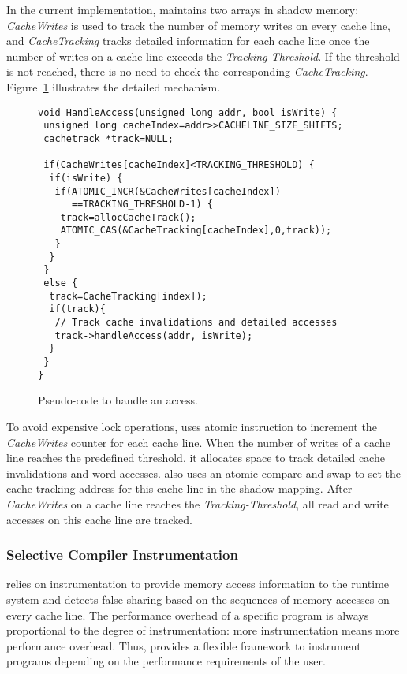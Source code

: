 In the current implementation, \Predator{} maintains two arrays in shadow memory: 
{\it CacheWrites} is used to track the number of memory writes on every cache line, and
{\it CacheTracking} tracks detailed information 
for each cache line once the number of writes on a cache line exceeds
the {\it Tracking-Threshold}. 
If the threshold is not reached, there is no need to check the corresponding {\it CacheTracking}. 
Figure~\ref{fig:algorithm} illustrates the detailed mechanism.

\begin{figure}[!t]
\begin{lstlisting}
void HandleAccess(unsigned long addr, bool isWrite) {
 unsigned long cacheIndex=addr>>CACHELINE_SIZE_SHIFTS;
 cachetrack *track=NULL;

 if(CacheWrites[cacheIndex]<TRACKING_THRESHOLD) {
  if(isWrite) {
   if(ATOMIC_INCR(&CacheWrites[cacheIndex]) 
      ==TRACKING_THRESHOLD-1) {
    track=allocCacheTrack();
    ATOMIC_CAS(&CacheTracking[cacheIndex],0,track));
   }
  } 
 }
 else {
  track=CacheTracking[index]);
  if(track){
   // Track cache invalidations and detailed accesses
   track->handleAccess(addr, isWrite);
  }
 }
}
\end{lstlisting}
\caption{Pseudo-code to handle an access.\label{fig:algorithm}}
\end{figure}

To avoid expensive lock operations, \Predator{} uses atomic instruction to increment 
the {\it CacheWrites} counter for each cache line. 
When the number of writes of a cache line reaches the predefined threshold,
it allocates space to track detailed cache invalidations and word accesses.
\Predator{} also 
uses an atomic compare-and-swap to set the cache tracking address for this cache line in
the shadow mapping.
After {\it CacheWrites} on a cache line reaches the {\it Tracking-Threshold}, 
all read and write accesses on this cache line are tracked.


\subsubsection{Selective Compiler Instrumentation}
\label{sec:selectinstrumentation}

\Predator{} relies on instrumentation to provide memory access information to the runtime system 
and detects false sharing based on the sequences of memory accesses on every cache line. 
The performance overhead of a specific program is always proportional to the degree of instrumentation: more instrumentation means more performance overhead. 
Thus, \Predator{} provides a flexible framework to instrument programs depending on the performance requirements of the user.

